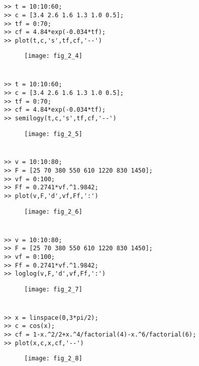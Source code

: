 \documentclass[../main.tex]{subfiles}
\begin{document}
\section{}
\begin{lstlisting}[numbers=none]
>> t = 10:10:60;
>> c = [3.4 2.6 1.6 1.3 1.0 0.5];
>> tf = 0:70;
>> cf = 4.84*exp(-0.034*tf);
>> plot(t,c,'s',tf,cf,'--') 
\end{lstlisting}
\begin{figure}[H]
		\texttt{[image: fig\_2\_4]}
		\label{fig:fig_2_ 4}
	\end{figure}
\section{}
\begin{lstlisting}[numbers=none]
>> t = 10:10:60;
>> c = [3.4 2.6 1.6 1.3 1.0 0.5];
>> tf = 0:70;
>> cf = 4.84*exp(-0.034*tf);
>> semilogy(t,c,'s',tf,cf,'--') 
\end{lstlisting}
\begin{figure}[H]
		\texttt{[image: fig\_2\_5]}
		\label{fig:fig_2_ 5}
	\end{figure}
\section{}
\begin{lstlisting}[numbers=none]
>> v = 10:10:80;
>> F = [25 70 380 550 610 1220 830 1450];
>> vf = 0:100;
>> Ff = 0.2741*vf.^1.9842;
>> plot(v,F,'d',vf,Ff,':') 
\end{lstlisting}
\begin{figure}[H]
		\texttt{[image: fig\_2\_6]}
		\label{fig:fig_2_ 6}
	\end{figure}
\section{}
\begin{lstlisting}[numbers=none]
>> v = 10:10:80;
>> F = [25 70 380 550 610 1220 830 1450];
>> vf = 0:100;
>> Ff = 0.2741*vf.^1.9842;
>> loglog(v,F,'d',vf,Ff,':') 
\end{lstlisting}
\begin{figure}[H]
		\texttt{[image: fig\_2\_7]}
		\label{fig:fig_2_ 7}
	\end{figure}


\section{}
\begin{lstlisting}[numbers=none]
>> x = linspace(0,3*pi/2);
>> c = cos(x);
>> cf = 1-x.^2/2+x.^4/factorial(4)-x.^6/factorial(6);
>> plot(x,c,x,cf,'--')
\end{lstlisting}
\begin{figure}[H]
		\texttt{[image: fig\_2\_8]}
		\label{fig:fig_2_ 8}
	\end{figure}
\end{document}
